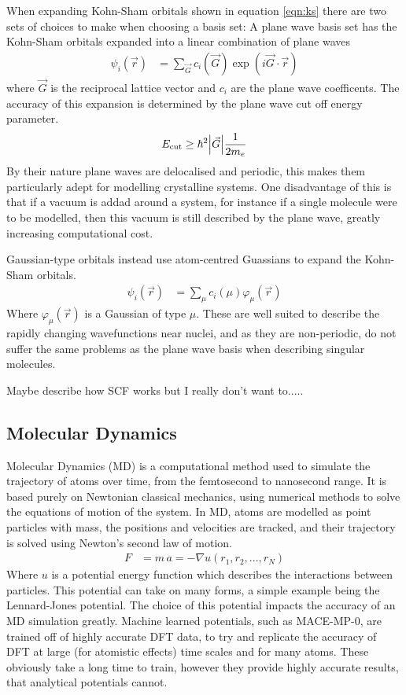 \documentclass[10pt,a4paper,twocolumn,twoside]{extarticle}
\begin{document}
When expanding Kohn-Sham orbitals shown in equation \ref{eqn:ks} there are two sets of choices to make when choosing a basis set:  A plane wave basis set has the Kohn-Sham orbitals expanded into a linear combination of plane waves 
\begin{align*}
		\psi_i(\vec{r}) &= \sum_{\vec{G}} c_i(\vec{G}) \exp(i\vec{G}\cdot\vec{r})
\end{align*}
where $\vec{G}$ is the reciprocal lattice vector and $c_i$ are the plane wave coefficents. The accuracy of this expansion is determined by the plane wave cut off energy parameter.
\begin{align*}
	E_\text{cut} \geq \hbar^2\absolutevalue{\vec{G}} \frac{1}{2m_e}
\end{align*}
By their nature plane waves are delocalised and periodic, this makes them particularly adept for modelling crystalline systems. One disadvantage of this is that if a vacuum is addad around a system, for instance if a single molecule were to be modelled, then this vacuum is still described by the plane wave, greatly increasing computational cost.

Gaussian-type orbitals instead use atom-centred Guassians to expand the Kohn-Sham orbitals. 
\begin{align*}
	\psi_i(\vec{r}) &= \sum_{\mu} c_i(\mu) \varphi_\mu(\vec{r})
\end{align*}
Where $\varphi_\mu(\vec{r})$ is a Gaussian of type $\mu$. These are well suited to describe the rapidly changing wavefunctions near nuclei, and as they are non-periodic, do not suffer the same problems as the plane wave basis when describing singular molecules.  

Maybe describe how SCF works but I really don't want to.....

\subsection{Molecular Dynamics}
Molecular Dynamics (MD) is a computational method used to simulate the trajectory of atoms over time, from the femtosecond to nanosecond range. It is based purely on Newtonian classical mechanics, using numerical methods to solve the equations of motion of the system. In MD, atoms are modelled as point particles with mass, the positions and velocities are tracked, and their trajectory is solved using Newton's second law of motion.
\begin{align*}
	F &= m\,a = -\nabla u(r_1, r_2, ..., r_N)
\end{align*}
Where $u$ is a potential energy function which describes the interactions between particles. This potential can take on many forms, a simple example being the Lennard-Jones potential. The choice of this potential impacts the accuracy of an MD simulation greatly. Machine learned potentials, such as MACE-MP-0\cite{MACE}, are trained off of highly accurate DFT data, to try and replicate the accuracy of DFT at large (for atomistic effects) time scales and for many atoms. These obviously take a long time to train, however they provide highly accurate results, that analytical potentials cannot.
\end{document}
